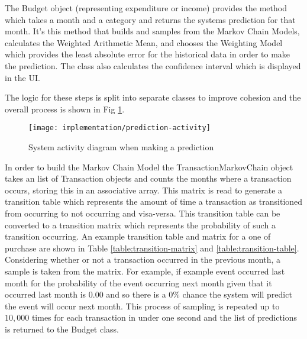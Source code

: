 The Budget object (representing expenditure or income) provides the  method which takes a month and a category and returns the systems prediction for that month. It's this method that builds and samples from the Markov Chain Models, calculates the Weighted Arithmetic Mean, and chooses the Weighting Model which provides the least absolute error for the historical data in order to make the prediction. The class also calculates the confidence interval which is displayed in the UI.

The logic for these steps is split into separate classes to improve cohesion and the overall process is shown in Fig \ref{fig:prediction-activity}. 

\begin{figure}[h]
    \centering
    \texttt{[image: implementation/prediction-activity]}
    \caption{System activity diagram when making a prediction}
    \label{fig:prediction-activity}
    
    \begin{comment}
(start)->|a|
|a|->[Markov Chain]->(Build MCMs)->(Sample from MCMs)->|b|
|a|->[Weighted Average Calculator]->(Select Weighting Model)->(Calculate Weighted Averages)->|b|
|b|->[Prediction Evaluator]->(Calculate Average and Confidence)->(end)
    \end{comment}
\end{figure}

In order to build the Markov Chain Model the TransactionMarkovChain object takes an list of Transaction objects and counts the months where a transaction occurs, storing this in an associative array. This matrix is read to generate a transition table which represents the amount of time a transaction as transitioned from occurring to not occurring and visa-versa. This transition table can be converted to a transition matrix which represents the probability of such a transition occurring. An example transition table and matrix for a one of purchase are shown in Table \ref{table:transition-matrix} and \ref{table:transition-table}.
%
Considering whether or not a transaction occurred in the previous month, a sample is taken from the matrix. For example, if example event occurred last month for the probability of the event occurring next month given that it occurred last month is $0.00$ and so there is a 0\% chance the system will predict the event will occur next month. This process of sampling is repeated up to $10,000$ times for each transaction in under one second and the list of predictions is returned to the Budget class.


